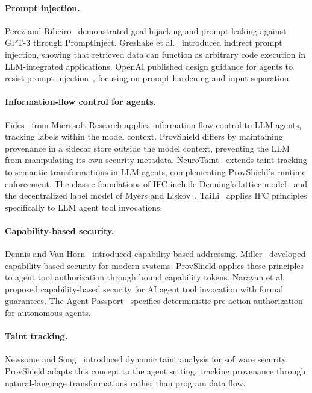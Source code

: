 \documentclass[sigconf,anonymous,review]{acmart}
\begin{document}
\paragraph{Prompt injection.}
Perez and Ribeiro~\cite{perez2022ignore} demonstrated goal hijacking and prompt leaking against GPT-3 through PromptInject. Greshake et al.~\cite{greshake2023indirect} introduced indirect prompt injection, showing that retrieved data can function as arbitrary code execution in LLM-integrated applications. OpenAI published design guidance for agents to resist prompt injection~\cite{openai_agent_prompt_injection_defense}, focusing on prompt hardening and input separation.

\paragraph{Information-flow control for agents.}
Fides~\cite{fides_agent_ifc} from Microsoft Research applies information-flow control to LLM agents, tracking labels within the model context. ProvShield differs by maintaining provenance in a sidecar store outside the model context, preventing the LLM from manipulating its own security metadata. NeuroTaint~\cite{neurotaint} extends taint tracking to semantic transformations in LLM agents, complementing ProvShield's runtime enforcement. The classic foundations of IFC include Denning's lattice model~\cite{denning1976lattice} and the decentralized label model of Myers and Liskov~\cite{myers1997decentralized}. TaiLi~\cite{taili} applies IFC principles specifically to LLM agent tool invocations.

\paragraph{Capability-based security.}
Dennis and Van Horn~\cite{dennis1966semantics} introduced capability-based addressing. Miller~\cite{miller2006capabilities} developed capability-based security for modern systems. ProvShield applies these principles to agent tool authorization through bound capability tokens. Narayan et al.~\cite{narayan2025capabilities} proposed capability-based security for AI agent tool invocation with formal guarantees. The Agent Passport~\cite{oap2026} specifies deterministic pre-action authorization for autonomous agents.

\paragraph{Taint tracking.}
Newsome and Song~\cite{newsome2005dynamic} introduced dynamic taint analysis for software security. ProvShield adapts this concept to the agent setting, tracking provenance through natural-language transformations rather than program data flow.
\end{document}
